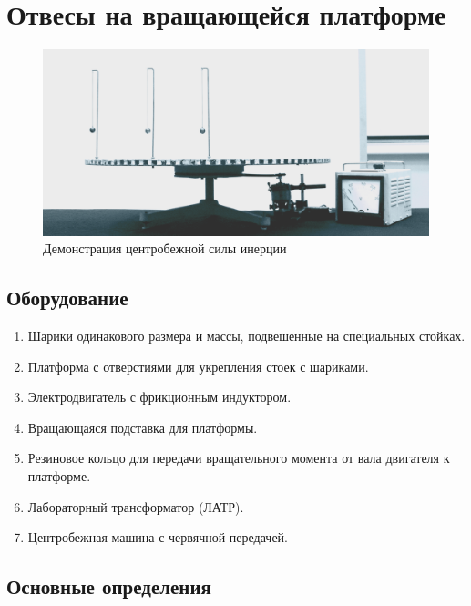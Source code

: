 \documentclass[All.tex]{subfiles}
\begin{document}
	

		\section{Отвесы на вращающейся платформе}

	
	\begin{figure}[H] 	
		\centering 	
		\includegraphics[width=0.9\linewidth]{platform-1.png}
		\caption{Демонстрация центробежной силы инерции}
		\label{platform-1}
	\end{figure}
	
	\subsection*{\textcolor{PineGreen}{Оборудование}}

	\begin{enumerate} 
		\item Шарики одинакового размера и массы, подвешенные на специальных стойках.
		\item Платформа с отверстиями для укрепления стоек с шариками.
		\item Электродвигатель с фрикционным индуктором.
		\item Вращающаяся подставка для платформы.
		\item Резиновое кольцо для передачи вращательного момента от вала двигателя к платформе.
		\item Лабораторный трансформатор (ЛАТР).
		\item Центробежная машина с червячной передачей.
	\end{enumerate}

	\subsection*{\textcolor{PineGreen}{Основные определения}}
		
\end{document}
